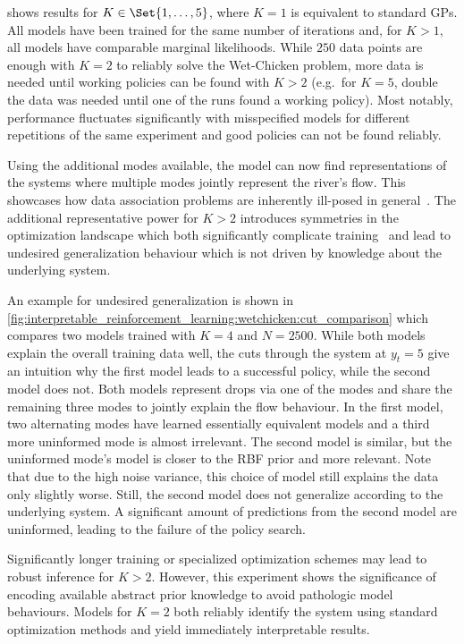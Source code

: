  shows results for $K \in \Set{1, \dots, 5}$, where $K=1$ is equivalent to standard GPs.
All models have been trained for the same number of iterations and, for $K > 1$, all models have comparable marginal likelihoods.
While $250$ data points are enough with $K=2$ to reliably solve the Wet-Chicken problem, more data is needed until working policies can be found with $K>2$ (e.g.\ for $K=5$, double the data was needed until one of the runs found a working policy).
Most notably, performance fluctuates significantly with misspecified models for different repetitions of the same experiment and good policies can not be found reliably.

Using the additional modes available, the model can now find representations of the systems where multiple modes jointly represent the river's flow.
This showcases how data association problems are inherently ill-posed in general~\parencite{barshalom_tracking_1990,cox_review_1993}.
The additional representative power for $K>2$ introduces symmetries in the optimization landscape which both significantly complicate training~\parencite{lazaro-gredilla_overlapping_2012,minka_expectation_2001} and lead to undesired generalization behaviour which is not driven by knowledge about the underlying system.

An example for undesired generalization is shown in \cref{fig:interpretable_reinforcement_learning:wetchicken:cut_comparison} which compares two models trained with $K=4$ and $N=2500$.
While both models explain the overall training data well, the cuts through the system at $y_t = 5$ give an intuition why the first model leads to a successful policy, while the second model does not.
Both models represent drops via one of the modes and share the remaining three modes to jointly explain the flow behaviour.
In the first model, two alternating modes have learned essentially equivalent models and a third more uninformed mode is almost irrelevant.
The second model is similar, but the uninformed mode's model is closer to the RBF prior and more relevant.
Note that due to the high noise variance, this choice of model still explains the data only slightly worse.
Still, the second model does not generalize according to the underlying system.
A significant amount of predictions from the second model are uninformed, leading to the failure of the policy search.

Significantly longer training or specialized optimization schemes may lead to robust inference for $K>2$.
However, this experiment shows the significance of encoding available abstract prior knowledge to avoid pathologic model behaviours.
Models for $K=2$ both reliably identify the system using standard optimization methods and yield immediately interpretable results.


